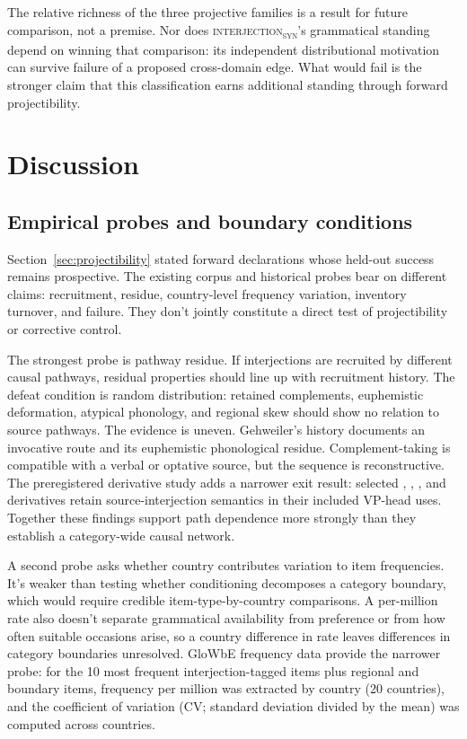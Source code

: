 \documentclass[12pt]{article}
\newcommand{\intj}[1]{\textsc{interjection\textsubscript{#1}}}
\begin{document}
The relative richness of the three projective families is a result
for future comparison, not a premise. Nor does \intj{syn}'s grammatical
standing depend on winning that comparison: its independent distributional
motivation can survive failure of a proposed cross-domain edge. What would
fail is the stronger claim that this classification earns additional standing
through forward projectibility.

\section{Discussion}\label{sec:discussion}

\subsection{Empirical probes and boundary conditions}

Section~\ref{sec:projectibility} stated forward declarations whose held-out
success remains prospective. The existing corpus and historical probes bear
on different claims: recruitment, residue, country-level frequency variation,
inventory turnover, and failure. They don't jointly constitute a direct test
of projectibility or corrective control.

The strongest probe is pathway residue. If interjections are recruited by
different causal pathways, residual properties should line up with
recruitment history. The defeat condition is random distribution:
retained complements, euphemistic deformation, atypical phonology, and
regional skew should show no relation to source pathways. The evidence
is uneven. Gehweiler's  history documents an invocative route
and its euphemistic phonological residue. Complement-taking  is
compatible with a verbal or optative source, but the sequence is
reconstructive. The preregistered derivative study adds a narrower exit
result: selected , , , and
 derivatives retain source-interjection semantics in their
included VP-head uses. Together these findings support path dependence more
strongly than they establish a category-wide causal network.

A second probe asks whether country contributes variation to item frequencies.
It's weaker than testing whether conditioning decomposes a category
boundary, which would require credible item-type-by-country comparisons. A
per-million rate also doesn't separate grammatical availability from
preference or from how often suitable occasions arise, so a country
difference in rate leaves differences in category boundaries unresolved.
GloWbE frequency data \citep{daviesfuchs2015} provide the narrower probe: for
the 10 most frequent interjection-tagged items plus regional and boundary
items, frequency per million was extracted by country (20 countries), and the
coefficient of variation (CV; standard deviation divided by the mean) was
computed across countries.
\end{document}
